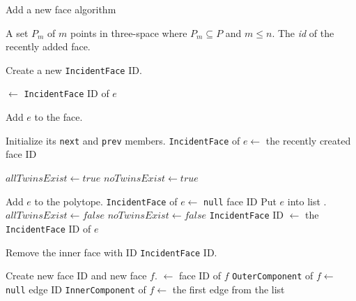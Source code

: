 	\begin{algorithm}[H]
	\caption{Add a new face algorithm}						\label{alg:add_face}
	\begin{algorithmic}[1]
		\Require A set $P_m$ of $m$ points in three-space where
			$P_m \subseteq P$ and $m \leq n$.
		\Ensure The \textit{id} of the recently added face.

		\Statex
						\label{alg:line:add_face_func}

			\State Create a new \texttt{IncidentFace} ID.
			\Statex								{}

					\State \vara $\gets$ \texttt{IncidentFace} ID of $e$
						
				\Else
					\State Add $e$ to the face.
				\EndIf

				\State Initialize its \texttt{next} and \texttt{prev} members.
				\State \texttt{IncidentFace} of $e \gets$ the recently created
					face ID
			\EndFor

			\Statex
			
			\State $allTwinsExist \gets true $
			\State $noTwinsExist   \gets true $

				
					\State Add $e$ to the polytope.
					\State \texttt{IncidentFace} of $e \gets$ \texttt{null} face
						ID
					\State Put $e$ into list \lste.
					\State $allTwinsExist \gets false$
				\Else
					\State $noTwinsExist   \gets false $
					\State \texttt{IncidentFace} ID $\gets$ the
						\texttt{IncidentFace} ID of $e$
				\EndIf
			\EndFor

			\Statex

				\State Remove the inner face with ID \texttt{IncidentFace} ID.
			\EndIf

			\Statex

				\State	Create new face ID and new face $f$.
				\State	\vara $\gets$ face ID of $f$
				\State	\texttt{OuterComponent} of $f \gets $ \texttt{null} edge
					ID
				\State	\texttt{InnerComponent} of $f \gets $ the first edge
					from the list \lste
			\EndIf

	\end{algorithmic}
	\end{algorithm}

